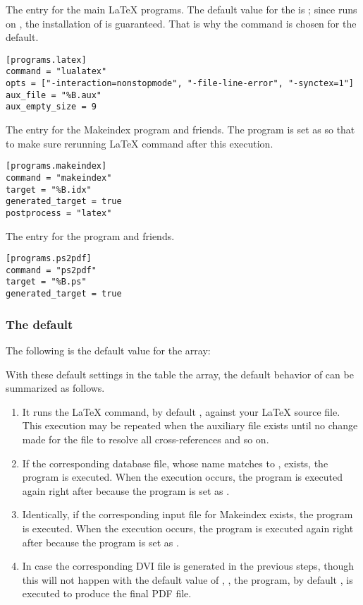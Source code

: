 \documentclass{llmk-doc}
\begin{document}
 The entry for the main {\LaTeX} programs. The default value for
the  is ; since  runs on
, the installation of {\LuaTeX} is guaranteed. That is why the
command is chosen for the default.
%
\begin{lstlisting}[style=toml]
[programs.latex]
command = "lualatex"
opts = ["-interaction=nonstopmode", "-file-line-error", "-synctex=1"]
aux_file = "%B.aux"
aux_empty_size = 9
\end{lstlisting}

 The entry for the Makeindex program and friends. The
 program is set as  so that to make sure
rerunning {\LaTeX} command after this execution.
%
\begin{lstlisting}[style=toml]
[programs.makeindex]
command = "makeindex"
target = "%B.idx"
generated_target = true
postprocess = "latex"
\end{lstlisting}

 The entry for the  program and friends.
%
\begin{lstlisting}[style=toml]
[programs.ps2pdf]
command = "ps2pdf"
target = "%B.ps"
generated_target = true
\end{lstlisting}

\subsubsection{The default }
\label{sec:default-sequence}

The following is the default value for the  array:
%
\begin{htcode}
\end{htcode}

With these default settings in the  table the 
array, the default behavior of  can be summarized as follows.
%
\begin{enumerate}
\item It runs the {\LaTeX} command, by default {\LuaLaTeX}, against your
  {\LaTeX} source file. This execution may be repeated when the auxiliary file
  exists until no change made for the file to resolve all cross-references and
  so on.
\item If the corresponding {\BibTeX} database file, whose name matches to
  , exists, the {\BibTeX} program is executed. When the execution
  occurs, the  program is executed again right after because
  the program is set as .
\item Identically, if the corresponding input file for Makeindex exists, the
  program is executed. When the execution occurs, the  program
  is executed again right after because the program is set as .
\item In case the corresponding DVI file is generated in the previous steps,
  though this will not happen with the default value of , \ie
  , the  program, by default ,
  is executed to produce the final PDF file.
\end{enumerate}
\end{document}
